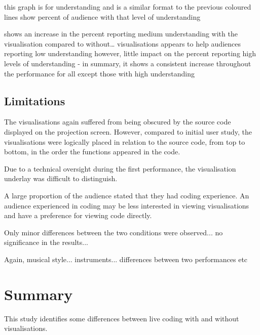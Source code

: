 this graph is for understanding and is a similar format to the previous
coloured lines show percent of audience with that level of understanding

shows an increase in the percent reporting medium understanding with the visualisation compared to without… 
visualisations appears to help audiences reporting low understanding
however, little impact on the percent reporting high levels of understanding
-  in summary, it shows a consistent increase throughout the performance for all except those with high understanding


\subsection{Limitations}

The visualisations again suffered from being obscured by the source code displayed on the projection screen. However, compared to initial user study, the visualisations were logically placed in relation to the source code, from top to bottom, in the order the functions appeared in the code.


Due to a technical oversight during the first performance, the visualisation underlay was difficult to distinguish. 

A large proportion of the audience stated that they had coding experience. An audience experienced in coding may be less interested in viewing visualisations and have a preference for viewing code directly.

Only minor differences between the two conditions were observed... no significance in the results...

Again, musical style... instruments... differences between two performances etc

\section{Summary}

This study identifies some differences between live coding with and without visualisations.









